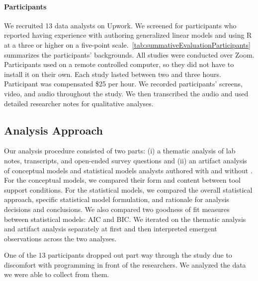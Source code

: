 \noindent \paragraph{Participants} We recruited 13 data analysts on Upwork. We
screened for participants who reported having experience with authoring
generalized linear models and using R at a three or higher on a five-point
scale.~\autoref{tab:summativeEvaluationParticipants} summarizes the
participants' backgrounds. All studies were conducted over Zoom. Participants used \rTisane
on a remote controlled computer, so they did not have to install it on their
own. Each study lasted between two and three hours. Participant was compensated
\$25 per hour. We recorded participants' screens, video, and audio throughout
the study. We then transcribed the audio and used detailed researcher notes for
qualitative analyses.

\tableSummativeEvalParticipants

\subsection{Analysis Approach}
Our analysis procedure consisted of two parts: (i) a thematic analysis of lab
notes, transcripts, and open-ended survey questions and (ii) an artifact
analysis of conceptual models and statistical models analysts authored with and
without \rTisane. For the conceptual models, we compared their form and content
between tool support conditions. For the statistical models, we compared the
overall statistical approach, specific statistical model formulation, and
rationale for analysis decisions and conclusions. We also compared two goodness
of fit measures between statistical models: AIC and BIC. We iterated on the
thematic analysis and artifact analysis separately at first and then interpreted
emergent observations across the two analyses. 

One of the 13 participants dropped out part way through the study due to
discomfort with programming in front of the researchers. We analyzed the data we
were able to collect from them. 


